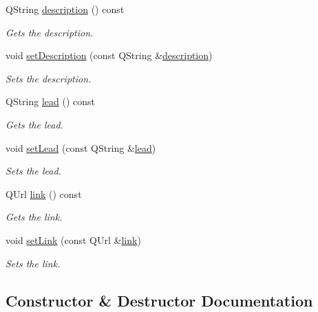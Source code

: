 \begin{DoxyCompactItemize}
Q\+String \mbox{\hyperlink{classQRail_1_1AlertsEngine_1_1Message_a0915a09de9f161ca15af08e198c3aef5}{description}} () const
\begin{DoxyCompactList}\small\item\em Gets the description. \end{DoxyCompactList}\item 
void \mbox{\hyperlink{classQRail_1_1AlertsEngine_1_1Message_a205d7904e25de29a259b7f68d4dac2a7}{set\+Description}} (const Q\+String \&\mbox{\hyperlink{classQRail_1_1AlertsEngine_1_1Message_a0915a09de9f161ca15af08e198c3aef5}{description}})
\begin{DoxyCompactList}\small\item\em Sets the description. \end{DoxyCompactList}\item 
Q\+String \mbox{\hyperlink{classQRail_1_1AlertsEngine_1_1Message_a9dae467ea28e07e75d2b18f113516552}{lead}} () const
\begin{DoxyCompactList}\small\item\em Gets the lead. \end{DoxyCompactList}\item 
void \mbox{\hyperlink{classQRail_1_1AlertsEngine_1_1Message_a737ca83ba775f3c836cff2530ff2449d}{set\+Lead}} (const Q\+String \&\mbox{\hyperlink{classQRail_1_1AlertsEngine_1_1Message_a9dae467ea28e07e75d2b18f113516552}{lead}})
\begin{DoxyCompactList}\small\item\em Sets the lead. \end{DoxyCompactList}\item 
Q\+Url \mbox{\hyperlink{classQRail_1_1AlertsEngine_1_1Message_a230424a1a57b9616ab6057cfa0d9aeba}{link}} () const
\begin{DoxyCompactList}\small\item\em Gets the link. \end{DoxyCompactList}\item 
void \mbox{\hyperlink{classQRail_1_1AlertsEngine_1_1Message_aa4c1f5cd9f81e74b7dd7a43c18e267cf}{set\+Link}} (const Q\+Url \&\mbox{\hyperlink{classQRail_1_1AlertsEngine_1_1Message_a230424a1a57b9616ab6057cfa0d9aeba}{link}})
\begin{DoxyCompactList}\small\item\em Sets the link. \end{DoxyCompactList}\end{DoxyCompactItemize}


\subsection{Constructor \& Destructor Documentation}
\mbox{\label{classQRail_1_1AlertsEngine_1_1Message_a9867f44f407fac012b4a29299dac9717}} 
